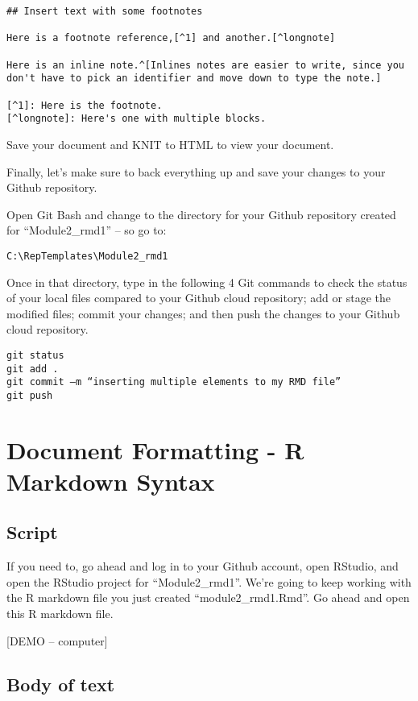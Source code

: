 \documentclass[
]{book}
\begin{document}
\begin{verbatim}
## Insert text with some footnotes

Here is a footnote reference,[^1] and another.[^longnote]

Here is an inline note.^[Inlines notes are easier to write, since you don't have to pick an identifier and move down to type the note.]

[^1]: Here is the footnote.
[^longnote]: Here's one with multiple blocks.
\end{verbatim}

Save your document and KNIT to HTML to view your document.

Finally, let's make sure to back everything up and save your changes to your Github repository.

Open Git Bash and change to the directory for your Github repository created for ``Module2\_rmd1'' -- so go to:

\texttt{C:\textbackslash{}RepTemplates\textbackslash{}Module2\_rmd1}

Once in that directory, type in the following 4 Git commands to check the status of your local files compared to your Github cloud repository; add or stage the modified files; commit your changes; and then push the changes to your Github cloud repository.

\begin{verbatim}
git status
git add .
git commit –m “inserting multiple elements to my RMD file”
git push
\end{verbatim}

\hypertarget{rmdsyntax}{%
\chapter{Document Formatting - R Markdown Syntax}\label{rmdsyntax}}

\hypertarget{script}{%
\section{Script}\label{script}}

If you need to, go ahead and log in to your Github account, open RStudio, and open the RStudio project for ``Module2\_rmd1''. We're going to keep working with the R markdown file you just created ``module2\_rmd1.Rmd''. Go ahead and open this R markdown file.

{[}DEMO -- computer{]}

\hypertarget{body-of-text}{%
\section{Body of text}\label{body-of-text}}
\end{document}
